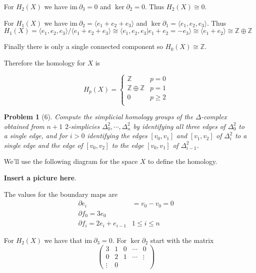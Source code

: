 \documentclass[10pt]{article}
\newcommand{\sk}{\vskip 10mm}
\newcommand{\bb}[1]{\mathbb{#1}}
\newcommand{\ima}{\mathrm{im}\ }
\theoremstyle{plain}
\newtheorem{problem}{Problem}
\theoremstyle{remark}
\begin{document}
For $H_2(X)$ we have $\ima \partial_3=0$ and $\ker\partial_2=0$. Thus
$H_2(X)\cong 0$.

For $H_1(X)$ we have $\ima \partial_2=\langle e_1+e_2+e_3\rangle$ and $\ker\partial_1=\langle e_1,e_2,e_3\rangle$.
Thus
\[ H_1(X)=\langle e_1,e_2,e_3\rangle/\langle e_1+e_2+e_3\rangle\cong\langle e_1,e_2,e_3|e_1+e_2=-e_3\rangle\cong\langle e_1+e_2\rangle\cong\bb{Z}\oplus\bb{Z}\]

Finally there is only a single connected component so $H_0(X)\cong\bb{Z}$.

Therefore the homology for $X$ is

\[
  H_p(X)=
  \left\{
    \begin{array}{ll}
      \bb{Z} & p=0\\
      \bb{Z}\oplus\bb{Z} & p=1\\
      0 & p\geq 2\\
    \end{array}
  \right.
\]

\sk

\begin{problem}[6]
  Compute the simplicial homology groups of the $\Delta$-complex obtained
  from $n+1$ $2$-simplicies $\Delta^2_0, \cdots, \Delta^2_n$ by identifying
  all three edges of $\Delta^2_0$ to a single edge, and for $i>0$ identifying
  the edges $[v_0,v_1]$ and $[v_1,v_2]$ of $\Delta^2_i$ to a single edge and
  the edge of $[v_0,v_2]$ to the edge $[v_0,v_1]$ of $\Delta^2_{i-1}$.
\end{problem}

We'll use the following diagram for the space $X$ to define the homology.

\textbf{Insert a picture here}.

The values for the boundary maps are
\begin{align*}
  \partial e_i &= v_0-v_0=0\\
  \partial f_0 = 3e_0\\
  \partial f_i = 2e_i+e_{i-1} & 1\leq i\leq n
\end{align*}

For $H_2(X)$ we have that $\ima \partial_3=0$. For $\ker \partial_2$ start with the matrix
\[
  \left(
  \begin{array}{ccccc}
    3&1&0&\cdots&0\\
    0&2&1&\cdots&\vdots\\
    \vdots&0& 
  \end{array}
  \right)
\] 

\sk

\end{document}

